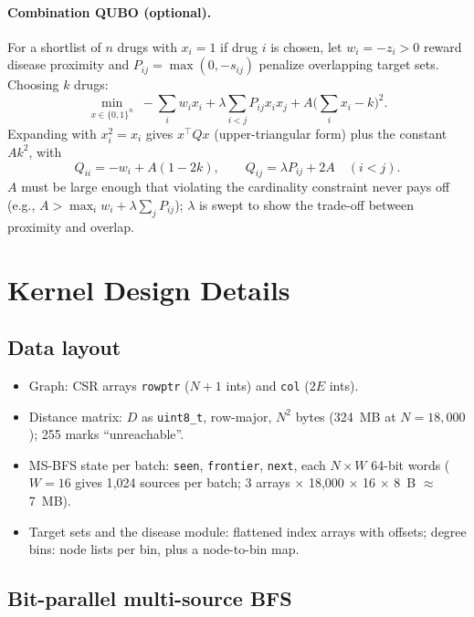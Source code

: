 \paragraph{Combination QUBO (optional).} For a shortlist of $n$ drugs with $x_i=1$ if drug $i$ is chosen, let $w_i=-z_i>0$ reward disease proximity and $P_{ij}=\max(0,-s_{ij})$ penalize overlapping target sets. Choosing $k$ drugs:
\begin{equation}
  \min_{x\in\{0,1\}^n}\; -\sum_i w_i x_i + \lambda\sum_{i<j}P_{ij}x_ix_j
  + A\Big(\sum_i x_i - k\Big)^2 .
\end{equation}
Expanding with $x_i^2=x_i$ gives $x^{\top}Qx$ (upper-triangular form) plus the constant $Ak^2$, with
\begin{equation}
  Q_{ii} = -w_i + A(1-2k), \qquad Q_{ij} = \lambda P_{ij} + 2A \quad (i<j).
\end{equation}
$A$ must be large enough that violating the cardinality constraint never pays off (e.g., $A > \max_i w_i + \lambda\sum_j P_{ij}$); $\lambda$ is swept to show the trade-off between proximity and overlap.

\section{Kernel Design Details}
\label{app:kernels}

\subsection{Data layout}

\begin{itemize}[nosep]
  \item Graph: CSR arrays \texttt{rowptr} ($N+1$ ints) and \texttt{col} ($2E$ ints).
  \item Distance matrix: $D$ as \texttt{uint8\_t}, row-major, $N^2$ bytes (324~MB at $N=18{,}000$); 255 marks ``unreachable''.
  \item MS-BFS state per batch: \texttt{seen}, \texttt{frontier}, \texttt{next}, each $N\times W$ 64-bit words ($W=16$ gives 1{,}024 sources per batch; 3 arrays $\times$ 18{,}000 $\times$ 16 $\times$ 8~B $\approx$ 7~MB).
  \item Target sets and the disease module: flattened index arrays with offsets; degree bins: node lists per bin, plus a node-to-bin map.
\end{itemize}

\subsection{Bit-parallel multi-source BFS}

